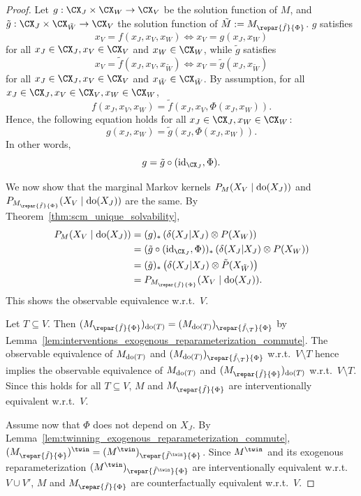 \begin{proof}
  Let $g : \CX_J \times \CX_W \to \CX_V$ be the solution function of $M$, 
  and $\tilde{g} : \CX_J \times \CX_{\tilde{W}} \to \CX_V$ the solution function of $\tilde{M} := M_{\repar{\tilde{f}}{\Phi}}$.
  $g$ satisfies
  $$x_V = f(x_J,x_V,x_W) \iff x_V = g(x_J,x_W)$$
  for all $x_J \in \CX_J, x_V \in \CX_V$ and $x_W \in \CX_W$, while $\tilde{g}$ satisfies
  $$x_V = \tilde{f}(x_J,x_V,x_{\tilde{W}}) \iff x_V = \tilde{g}(x_J,x_{\tilde{W}})$$
  for all $x_J \in \CX_J, x_V \in \CX_V$ and $x_{\tilde{W}} \in \CX_{\tilde{W}}$.
  By assumption, for all $x_J \in \CX_J, x_V \in \CX_V, x_W \in \CX_W$,
    $$f(x_J,x_V,x_W) = \tilde{f}(x_J,x_V,\Phi(x_J,x_W)).$$
  Hence, the following equation holds for all $x_J \in \CX_J, x_W \in \CX_W$:
  $$g(x_J,x_W) = \tilde{g}(x_J,\Phi(x_J,x_W)).$$
  In other words,
  $$g = \tilde g \circ (\id_{\CX_J},\Phi).$$

  We now show that the marginal Markov kernels $P_{M}(X_V \mid \operatorname{do}(X_J))$ and $P_{M_{\repar{\tilde{f}}{\Phi}}}(X_V \mid \doit(X_J))$ are the same.
  By Theorem~\ref{thm:scm_unique_solvability}, 
  \begin{align*}
    P_{M}(X_V \mid \doit(X_J)) 
    & = (g)_* \lp \delta(X_J|X_J) \otimes P(X_W) \rp \\
    & = (\tilde g \circ (\id_{\CX_J},\Phi))_* \lp \delta(X_J|X_J) \otimes P(X_W) \rp \\
    & = (\tilde{g})_* \lp \delta(X_J|X_J) \otimes \tilde{P}(X_{\tilde{W}})  \rp \\
    & = P_{M_{\repar{\tilde{f}}{\Phi}}}(X_V \mid \doit(X_J)).
  \end{align*}
  This shows the observable equivalence w.r.t.\ $V$.

  Let $T \subseteq V$. 
  Then $(M_{\repar{\tilde{f}}{\Phi}})_{\doit(T)} = (M_{\doit(T)})_{\repar{\tilde{f}_{\sm T}}{\Phi}}$ by Lemma~\ref{lem:interventions_exogenous_reparameterization_commute}.
  The observable equivalence of $M_{\operatorname{do}(T)}$ and $(M_{\doit(T)})_{\repar{\tilde{f}_{\sm T}}{\Phi}}$ w.r.t.\ $V \setminus T$ hence implies the observable equivalence of $M_{\operatorname{do}(T)}$ and $(M_{\repar{\tilde{f}}{\Phi}})_{\doit(T)}$ w.r.t.\ $V \setminus T$.
  Since this holds for all $T \subseteq V$, $M$ and $M_{\repar{\tilde{f}}{\Phi}}$ are interventionally equivalent w.r.t.\ $V$.

  Assume now that $\Phi$ does not depend on $X_J$. By Lemma~\ref{lem:twinning_exogenous_reparameterization_commute}, $(M_{\repar{\tilde{f}}{\Phi}})^\twin = (M^\twin)_{\repar{\tilde{f}^\twin}{\Phi}}$.
  Since $M^\twin$ and its exogenous reparameterization $(M^\twin)_{\repar{\tilde{f}^\twin}{\Phi}}$ are interventionally equivalent w.r.t.\ $V \cup V'$, $M$ and $M_{\repar{\tilde{f}}{\Phi}}$ are counterfactually equivalent w.r.t.\ $V$.
\end{proof}
